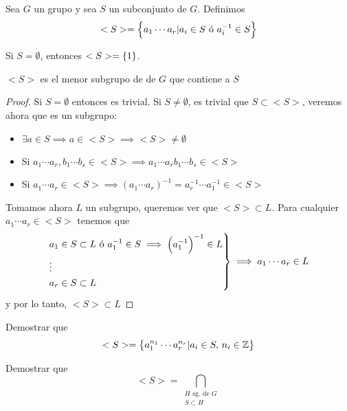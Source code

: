 \begin{defi}
        Sea $G$ un grupo y sea $S$ un subconjunto de $G$. Definimos 
        \[
            <S> = \left\{a_1 \cdots a_r \vert a_i \in S \text{ ó } a^{-1}_i \in S\right\}
        \]
\end{defi}

\begin{obs}
    Si $S = \emptyset$, entonces $<S> = \left\{1\right\}$.
\end{obs}

\begin{obs}
    $<S>$ es el menor subgrupo de de $G$ que contiene a $S$
\end{obs}

\begin{proof}
    Si $S = \emptyset$ entonces es trivial.
    Si $S \neq \emptyset$, es trivial que $S \subset <S>$, veremos ahora que es un subgrupo:
    \begin{itemize}
        \item $\exists a \in S \implies a \in <S> \implies <S> \neq \emptyset$
        \item Si $a_1\cdots a_r, b_1 \cdots b_s \in <S> \implies a_1 \cdots a_r b_1 \cdots b_s \in <S>$
        \item Si $a_1 \cdots a_r \in <S> \implies \left( a_1 \cdots a_r \right)^{-1} =
            a^{-1}_r \cdots a^{-1}_1 \in <S>$
    \end{itemize}
    Tomamos ahora $L$ un subgrupo, queremos ver que $<S> \subset L$.
    Para cualquier $a_1 \cdots a_r \in <S>$ tenemos que
    \[
        \begin{rcases}
            a_1 \in S \subset L \text{ ó } a^{-1}_1 \in S \implies \left( a^{-1}_1 \right)^{-1} \in L\\
            \vdots \\
            a_r \in S \subset L
        \end{rcases}
        \implies a_1 \cdots a_r \in L
    \]
    y por lo tanto, $<S> \subset L$
\end{proof}

\begin{ej}
    Demostrar que
    \[
        <S> = \left\{a^{n_1}_1 \cdots a^{n_r}_r \vert a_i \in S, \, n_i \in \mathbb{Z}\right\}
    \]
\end{ej}

\begin{ej}
    Demostrar que
    \[
        <S> = \bigcap_{\substack{H \text{ sg. de } G \\ S \subset H}}
    \]
\end{ej}
